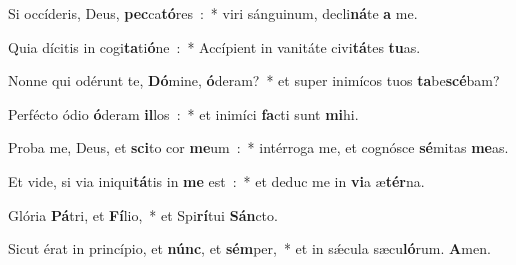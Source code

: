 \item Si occíderis, Deus, \textbf{pec}ca\textbf{tó}res~:~* viri sánguinum, decli\textbf{ná}te \textbf{a} me.
\item Quia dícitis in cogi\textbf{ta}ti\textbf{ó}ne~:~* Accípient in vanitáte civi\textbf{tá}tes \textbf{tu}as.
\item Nonne qui odérunt te, \textbf{Dó}mine, \textbf{ó}deram?~* et super inimícos tuos \textbf{ta}be\textbf{scé}bam?
\item Perfécto ódio \textbf{ó}deram \textbf{il}los~:~* et inimíci \textbf{fa}cti sunt \textbf{mi}hi.
\item Proba me, Deus, et \textbf{sci}to cor \textbf{me}um~:~* intérroga me, et cognósce \textbf{sé}mitas \textbf{me}as.
\item Et vide, si via iniqui\textbf{tá}tis in \textbf{me} est~:~* et deduc me in \textbf{vi}a æ\textbf{tér}na.
\item Glória \textbf{Pá}tri, et \textbf{Fí}lio,~* et Spi\textbf{rí}tui \textbf{Sán}cto.
\item Sicut érat in princípio, et \textbf{núnc}, et \textbf{sém}per,~* et in sǽcula sæcu\textbf{ló}rum. \textbf{A}men.